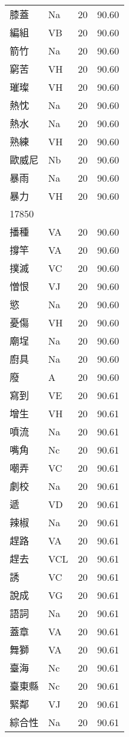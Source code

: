 \documentclass[twocolumn]{book}
\begin{document}
\begin{supertabular}{llrr}
膝蓋 & Na & 20 &  90.60\\
編組 & VB & 20 &  90.60\\
箭竹 & Na & 20 &  90.60\\
窮苦 & VH & 20 &  90.60\\
璀璨 & VH & 20 &  90.60\\
熱忱 & Na & 20 &  90.60\\
熱水 & Na & 20 &  90.60\\
熟練 & VH & 20 &  90.60\\
歐威尼 & Nb & 20 &  90.60\\
暴雨 & Na & 20 &  90.60\\
暴力 & VH & 20 &  90.60\\
17850\\
播種 & VA & 20 &  90.60\\
撐竿 & VA & 20 &  90.60\\
撲滅 & VC & 20 &  90.60\\
憎恨 & VJ & 20 &  90.60\\
慾 & Na & 20 &  90.60\\
憂傷 & VH & 20 &  90.60\\
廟埕 & Na & 20 &  90.60\\
廚具 & Na & 20 &  90.60\\
廢 & A & 20 &  90.60\\
寫到 & VE & 20 &  90.61\\
增生 & VH & 20 &  90.61\\
噴流 & Na & 20 &  90.61\\
嘴角 & Nc & 20 &  90.61\\
嘲弄 & VC & 20 &  90.61\\
劇校 & Na & 20 &  90.61\\
遞 & VD & 20 &  90.61\\
辣椒 & Na & 20 &  90.61\\
趕路 & VA & 20 &  90.61\\
趕去 & VCL & 20 &  90.61\\
誘 & VC & 20 &  90.61\\
說成 & VG & 20 &  90.61\\
語詞 & Na & 20 &  90.61\\
蓋章 & VA & 20 &  90.61\\
舞獅 & VA & 20 &  90.61\\
臺海 & Nc & 20 &  90.61\\
臺東縣 & Nc & 20 &  90.61\\
緊鄰 & VJ & 20 &  90.61\\
綜合性 & Na & 20 &  90.61\\

\end{supertabular}
\end{document}
